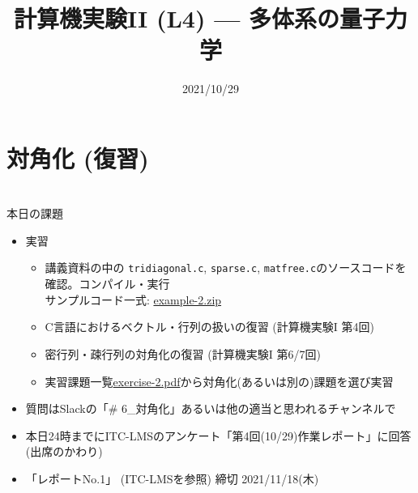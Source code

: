 \documentclass[10pt,dvipdfmx]{beamer}
\title{計算機実験II (L4) --- 多体系の量子力学}
\date{2021/10/29}
\begin{document}
\begin{frame}
  \titlepage
  \tableofcontents
\end{frame}



\section{対角化 (復習)}






\section{}
\begin{frame}[t]{本日の課題}
  \begin{itemize}
  \item 実習
    \begin{itemize}
    \item 講義資料の中の {\tt tridiagonal.c}, {\tt sparse.c}, {\tt matfree.c}のソースコードを確認。コンパイル・実行 \\
      サンプルコード一式: \href{https://github.com/todo-group/ComputerExperiments/releases/tag/2021a-computer2}{example-2.zip}
    \item C言語におけるベクトル・行列の扱いの復習 (計算機実験I 第4回)
    \item 密行列・疎行列の対角化の復習 (計算機実験I 第6/7回)
    \item 実習課題一覧\href{https://github.com/todo-group/ComputerExperiments/releases/tag/2020a-computer2}{exercise-2.pdf}から対角化(あるいは別の)課題を選び実習
    \end{itemize}
  \item 質問はSlackの「\# 6\_対角化」あるいは他の適当と思われるチャンネルで
  \item 本日24時までにITC-LMSのアンケート「第4回(10/29)作業レポート」に回答(出席のかわり)
  \item 「レポートNo.1」 (ITC-LMSを参照) 締切 2021/11/18(木)
  \end{itemize}
\end{frame}
\end{document}

